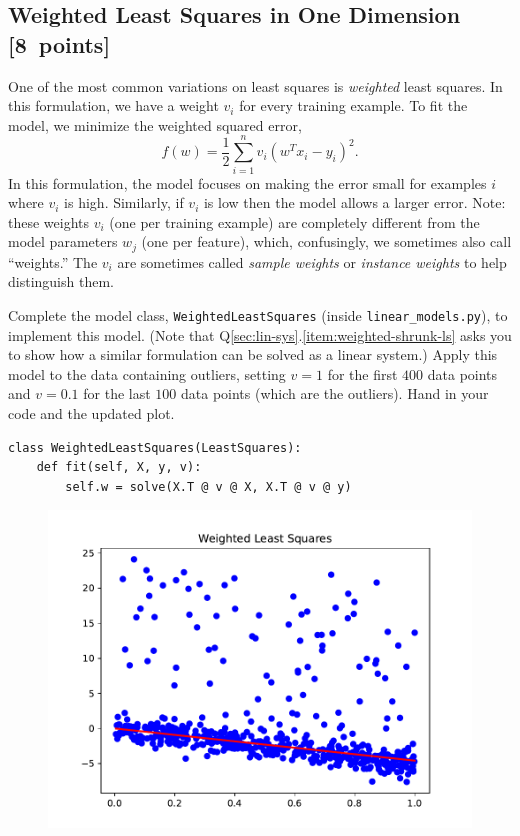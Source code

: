 \documentclass{article}
\newcommand{\blu}[1]{{\textcolor{blu}{#1}}}
\let\ask\blu
\newcommand\pts[1]{\textcolor{pointscolour}{[#1~points]}}
\begin{document}
\subsection{Weighted Least Squares in One Dimension \pts{8}}

One of the most common variations on least squares is \emph{weighted} least squares. In this formulation, we have a weight $v_i$ for every training example. To fit the model, we minimize the weighted squared error,
\[
f(w) =  \frac{1}{2}\sum_{i=1}^n v_i(w^Tx_i - y_i)^2.
\]
In this formulation, the model focuses on making the error small for examples $i$ where $v_i$ is high. Similarly, if $v_i$ is low then the model allows a larger error. Note: these weights $v_i$ (one per training example) are completely different from the model parameters $w_j$ (one per feature), which, confusingly, we sometimes also call ``weights.'' The $v_i$ are sometimes called \emph{sample weights} or \emph{instance weights} to help distinguish them.

Complete the model class, \texttt{WeightedLeastSquares} (inside \texttt{linear\_models.py}), to implement this model.
(Note that Q\ref{sec:lin-sys}.\ref{item:weighted-shrunk-ls} asks you to show how a similar formulation can be solved as a linear system.)
Apply this model to the data containing outliers, setting $v = 1$ for the first
$400$ data points and $v = 0.1$ for the last $100$ data points (which are the outliers).
\ask{Hand in your code and the updated plot}.
\begin{verbatim}
class WeightedLeastSquares(LeastSquares):  
    def fit(self, X, y, v):
        self.w = solve(X.T @ v @ X, X.T @ v @ y)
\end{verbatim}

\begin{figure}
	\centering
	\includegraphics[width = .7\textwidth]{figs/Weighted_least_squares_outliers.pdf}
\end{figure}
\end{document}

